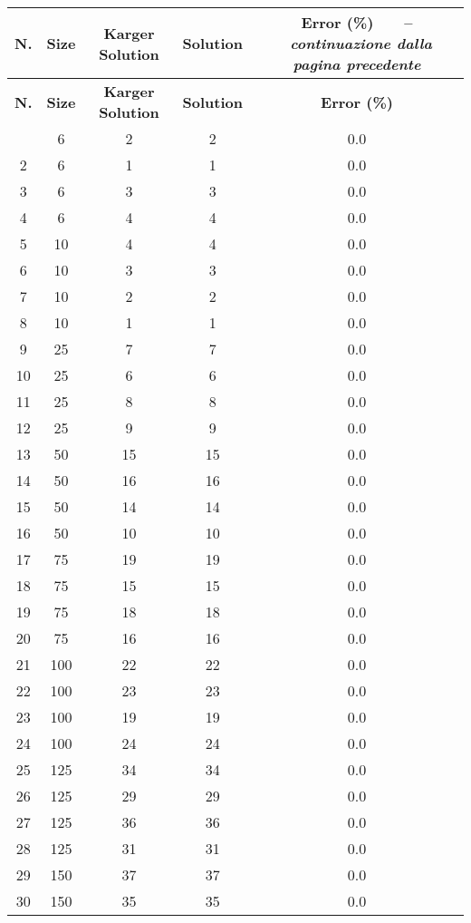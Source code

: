 \begin{center}
	\begin{longtable}{|c|c|c|c|c|}	
		\hline
		\textbf{N.} & \textbf{Size} & \textbf{Karger Solution} & \textbf{Solution} & \textbf{Error (\%)}
		\endfirsthead
		{\tablename\ \thetable\ \ --\  \textit{continuazione dalla pagina precedente}} \\
		\hline
		\textbf{N.} & \textbf{Size} & \textbf{Karger Solution} & \textbf{Solution} & \textbf{Error (\%)}
		\endhead
		\hline {\textit{Continua nella pagina seguente}} \\
		\endfoot  
		\endlastfoot
		\hline
		1 & 6 & 2 & 2 & 0.0 \\
		2 & 6 & 1 & 1 & 0.0 \\
		3 & 6 & 3 & 3 & 0.0 \\
		4 & 6 & 4 & 4 & 0.0 \\
		5 & 10 & 4 & 4 & 0.0 \\
		6 & 10 & 3 & 3 & 0.0 \\
		7 & 10 & 2 & 2 & 0.0 \\
		8 & 10 & 1 & 1 & 0.0 \\
		9 & 25 & 7 & 7 & 0.0 \\
		10 & 25 & 6 & 6 & 0.0 \\
		11 & 25 & 8 & 8 & 0.0 \\
		12 & 25 & 9 & 9 & 0.0 \\
		13 & 50 & 15 & 15 & 0.0 \\
		14 & 50 & 16 & 16 & 0.0 \\
		15 & 50 & 14 & 14 & 0.0 \\
		16 & 50 & 10 & 10 & 0.0 \\
		17 & 75 & 19 & 19 & 0.0 \\
		18 & 75 & 15 & 15 & 0.0 \\
		19 & 75 & 18 & 18 & 0.0 \\
		20 & 75 & 16 & 16 & 0.0 \\
		21 & 100 & 22 & 22 & 0.0 \\
		22 & 100 & 23 & 23 & 0.0 \\
		23 & 100 & 19 & 19 & 0.0 \\
		24 & 100 & 24 & 24 & 0.0 \\
		25 & 125 & 34 & 34 & 0.0 \\
		26 & 125 & 29 & 29 & 0.0 \\
		27 & 125 & 36 & 36 & 0.0 \\
		28 & 125 & 31 & 31 & 0.0 \\
		29 & 150 & 37 & 37 & 0.0 \\
		30 & 150 & 35 & 35 & 0.0 \\

\end{longtable}
\end{center}
